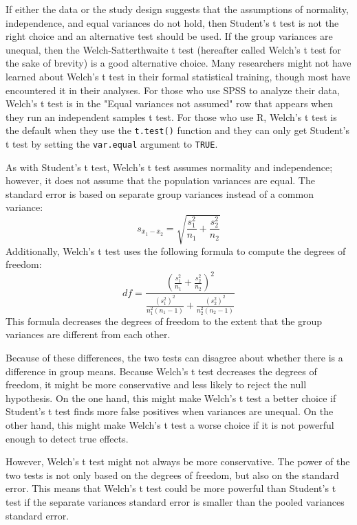 \documentclass[man,a4paper,noextraspace,apacite]{apa6}
\begin{document}
    If either the data or the study design suggests that the assumptions of 
normality, independence, and equal variances do not hold, then Student's t test 
is not the right choice and an alternative test should be used. If the group 
variances are unequal, then the Welch-Satterthwaite t test (hereafter called 
Welch's t test for the sake of brevity) is a good alternative choice. Many 
researchers might not have learned about Welch's t test in their formal 
statistical training, though most have encountered it in their analyses. For 
those who use SPSS to analyze their data, Welch's t test is in the "Equal 
variances not assumed" row that appears when they run an independent samples t 
test. For those who use R, Welch's t test is the default when they use the 
\texttt{t.test()} function and they can only get Student's t test by setting 
the \texttt{var.equal} argument to \texttt{TRUE}.
    
        As with Student's t test, Welch's t test assumes normality and 
independence; however, it does not assume that the population variances are 
equal. The standard error is based on separate group variances instead of a 
common variance:
    \begin{equation}
    s_{\overline{x}_1-\overline{x}_2} = \sqrt{\frac{s_1^2}{n_1} + \frac{s_2^2}{n_2}}
    \end{equation}
Additionally, Welch's t test uses the following formula to compute the degrees of freedom: 
    \begin{equation}
    df = \frac{(\frac{s_1^2}{n_1} + \frac{s_2^2}{n_2})^2}{\frac{(s_1^2)^2}{n_1^2(n_1-1)} + \frac{(s_2^2)^2}{n_2^2(n_2-1)}}
    \end{equation}
This formula decreases the degrees of freedom to the extent that the group
variances are different from each other.

Because of these 
differences, the two tests can disagree about whether there is a difference in 
group means. Because Welch's t test decreases the degrees of freedom, it might 
be more conservative and less likely to reject the null hypothesis. On the one 
hand, this might make Welch's t test a better choice if Student's t test finds 
more false positives when variances are unequal. On the other hand, this might 
make Welch's t test a worse choice if it is not powerful enough to detect true 
effects. 
        
    However, Welch's t test might not always be more conservative. The power of 
the two tests is not only based on the degrees of freedom, but also on the 
standard error. This means that Welch's t test could be more powerful than 
Student's t test if the separate variances standard error is smaller than the 
pooled variances standard error.
    
\end{document}

